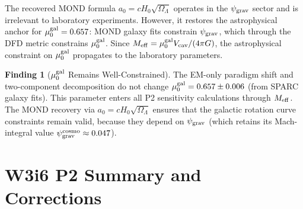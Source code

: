\documentclass[11pt]{article}
\newcommand{\Meff}{M_{\rm eff}}
\newcommand{\Vcav}{V_{\rm cav}}
\newcommand{\muG}{\mu_0^{\rm gal}}
\newcommand{\psigrav}{\psi_{\rm grav}}
\theoremstyle{definition}
\newtheorem{finding}[theorem]{Finding}
\theoremstyle{remark}
\begin{document}
The recovered MOND formula $a_0 = cH_0\sqrt{\Omega_\Lambda}$ operates
in the $\psigrav$ sector and is irrelevant to laboratory experiments.
However, it restores the astrophysical anchor for $\muG = 0.657$:
MOND galaxy fits constrain $\psigrav$, which through the DFD metric
constrains $\muG$. Since $\Meff = \muG\Vcav/(4\pi G)$, the
astrophysical constraint on $\muG$ propagates to the laboratory
parameters.

\begin{finding}[$\muG$ Remains Well-Constrained]
\label{find:muG_constrained}
The EM-only paradigm shift and two-component decomposition do not
change $\muG = 0.657 \pm 0.006$ (from SPARC galaxy fits). This parameter
enters all P2 sensitivity calculations through $\Meff$. The MOND
recovery via $a_0 = cH_0\sqrt{\Omega_\Lambda}$ ensures that the
galactic rotation curve constraints remain valid, because they depend
on $\psigrav$ (which retains its Mach-integral value
$\psigrav^{\rm cosmo} \approx 0.047$).
\end{finding}

\section{W3i6 P2 Summary and Corrections}
\label{sec:P2_summary}
\end{document}

